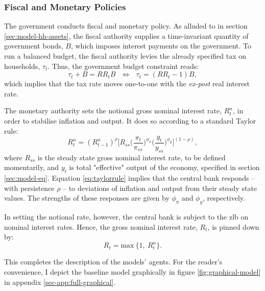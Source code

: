 \documentclass[a4paper,12pt]{article} %
\numberwithin{equation}{section} %
\numberwithin{figure}{section}
\numberwithin{table}{section}
\begin{document}
\subsubsection{Fiscal and Monetary Policies}
\label{sec:model-policy}

The government conducts fiscal and monetary policy. As alluded to in section \ref{sec:model-hh-assets}, the fiscal authority supplies a time-invariant quantity of government bonds, $B$, which imposes interest payments on the government. To run a balanced budget, the fiscal authority levies the already specified tax on households, $\tau_t$. Thus, the government budget constraint reads:
\begin{equation}
    \tau_t + B = RR_t B \ \ \ \Leftrightarrow \ \ \ \tau_t = (RR_t - 1)B, \label{eq:fiscal-budget}
\end{equation}
which implies that the tax rate moves one-to-one with the \textit{ex-post} real interest rate.

The monetary authority sets the notional gross nominal interest rate, $R_{t}^n$, in order to stabilise inflation and output. It does so according to a standard Taylor rule:
\begin{equation}
    R_{t}^n = ( R_{t-1}^n )^{\rho} \Bigg[ R_{ss} \Bigg( \frac{\pi_t}{\pi_{ss}} \Bigg)^{\phi_{\pi}} \Bigg( \frac{y_t}{y_{ss}} \Bigg)^{\phi_y} \Bigg]^{(1-\rho)}, \label{eq:taylorrule}
\end{equation}
where $R_{ss}$ is the steady state gross nominal interest rate, to be defined momentarily, and $y_t$ is total "effective" output of the economy, specified in section \ref{sec:model-eq}. Equation \eqref{eq:taylorrule} implies that the central bank responds -- with persistence $\rho$ -- to deviations of inflation and output from their steady state values. The strengths of these responses are given by $\phi_{\pi}$ and $\phi_y$, respectively. 

In setting the notional rate, however, the central bank is subject to the \Gls{zlb} on nominal interest rates. Hence, the gross nominal interest rate, $R_t$, is pinned down by: %
\begin{equation}
    R_t = \text{max} \ \{ 1, \ R_{t}^n \}. \label{eq:zlb}
\end{equation}

This completes the description of the models' agents. For the reader's convenience, I depict the baseline model graphically in figure \ref{fig:graphical-model} in appendix \ref{sec-app:full-graphical}.
\end{document}
